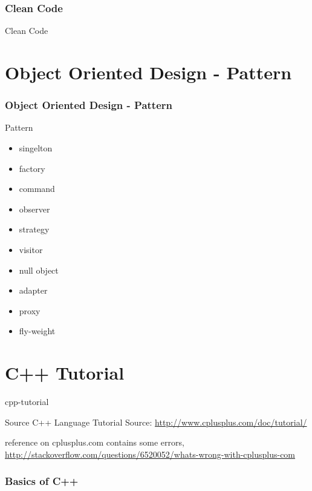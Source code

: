 \documentclass{beamer}
\begin{document}
\section{Clean Code}
\begin{frame}{Clean Code}
\end{frame}

\part{Object Oriented Design - Pattern}
\section{Object Oriented Design - Pattern}

\begin{frame}{Pattern}
\begin{itemize}
  \item singelton
  \item factory
  \item command
  \item observer
  \item strategy
  \item visitor
  \item null object
  \item adapter
  \item proxy
  \item fly-weight
\end{itemize}
\end{frame}

\part{C++ Tutorial}{cpp-tutorial}

\begin{frame}{Source}
C++ Language Tutorial
Source: \url{http://www.cplusplus.com/doc/tutorial/}
\begin{block}

reference on cplusplus.com contains some errors,
\url{http://stackoverflow.com/questions/6520052/whats-wrong-with-cplusplus-com}
\end{block}
\end{frame}

\section{Basics of C++}
\end{document}
